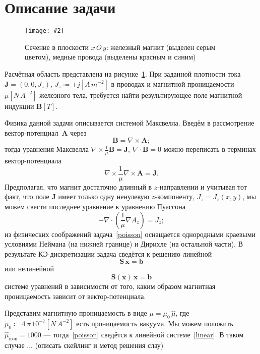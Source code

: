 \documentclass[a4paper, 14pt]{extarticle}
\newcommand{\includegraphicsw}[2][1.]{\texttt{[image: \#2]}}
\newcommand{\vect}[1]{\boldsymbol{\mathbf{#1}}}
\begin{document}
	
	\section{Описание задачи}
	
	\begin{figure}[b!]
		\centering
		\includegraphicsw[.6]{magnet.png}
		\caption{Сечение в плоскости $x\,O\,y$: железный магнит (выделен серым цветом), медные провода (выделены красным и синим)}
		\label{fig:magnet}
	\end{figure}
	
	Расчётная область представлена на рисунке~\ref{fig:magnet}. При заданной плотности тока $\vect J = (0, 0, J_z)$, $J_z \coloneqq \pm j \left[A\,m^{-2}\right]$ в проводах и магнитной проницаемости $\mu \left[N\,A^{-2}\right]$ железного тела, требуется найти результирующее поле магнитной индукции $\vect B \left[T\right]$.
	
	Физика данной задачи описывается системой Максвелла. Введём в рассмотрение вектор-потенциал~$\vect A$ через 
	$$
		\vect B = \nabla\times\vect A;
	$$
	тогда уравнения Максвелла $\nabla\times\frac{1}{\mu} \vect B = \vect J$, $\nabla\cdot\vect B = 0$ можно переписать в терминах вектор-потенциала
	$$
		\nabla\times\frac{1}{\mu}\nabla\times\vect A = \vect J.
	$$
	Предполагая, что магнит достаточно длинный в $z$-направлении и учитывая тот факт, что поле $\vect J$ имеет только одну ненулевую $z$-компоненту, $J_z = J_z(x, y)$, мы можем свести последнее уравнение к уравнению Пуассона
	\begin{equation}\label{poisson}
		-\nabla\cdot(\frac{1}{\mu}\nabla A_z) = J_z;
	\end{equation}
	из физических соображений задача~\eqref{poisson} оснащается однородными краевыми условиями Неймана (на нижней границе) и Дирихле (на остальной части). В результате КЭ-дискретизации задача сведётся к решению линейной
	\begin{equation}\label{linear}
		\vect S\,\vect x = \vect b
	\end{equation}
	или нелинейной
	\begin{equation}\label{nonlinear}
		\vect S(\vect x)\,\vect x = \vect b
	\end{equation}
	системе уравнений в зависимости от того, каким образом магнитная проницаемость зависит от вектор-потенциала. 
	
	Представим магнитную проницаемость в виде $\mu = \mu_0\,\hat\mu$, где $\mu_0 \coloneqq 4\,\pi\,10^{-7} \left[N\,A^{-2}\right]$ есть проницаемость вакуума. Мы можем положить $\hat\mu_{\text{iron}} = 1000$ --- тогда~\eqref{poisson} сведётся к линейной системе~\eqref{linear}. В таком случае ... (описать скейлинг и метод решения слау)
	
\end{document}
